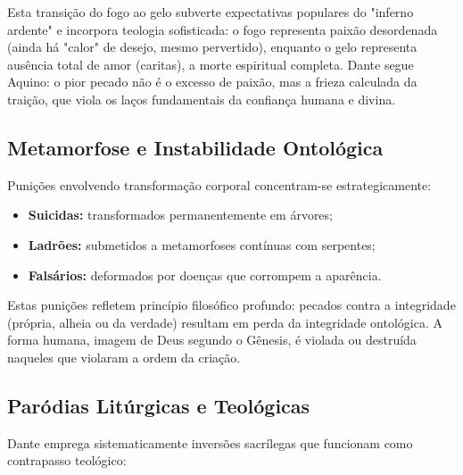 Esta transição do fogo ao gelo subverte expectativas populares do "inferno ardente" e incorpora teologia sofisticada: o fogo representa paixão desordenada (ainda há "calor" de desejo, mesmo pervertido), enquanto o gelo representa ausência total de amor (caritas), a morte espiritual completa. Dante segue Aquino: o pior pecado não é o excesso de paixão, mas a frieza calculada da traição, que viola os laços fundamentais da confiança humana e divina.

\subsection{Metamorfose e Instabilidade Ontológica}

Punições envolvendo transformação corporal concentram-se estrategicamente:

\begin{itemize}
  \item \textbf{Suicidas:} transformados permanentemente em árvores;
  \item \textbf{Ladrões:} submetidos a metamorfoses contínuas com serpentes;
  \item \textbf{Falsários:} deformados por doenças que corrompem a aparência.
\end{itemize}

Estas punições refletem princípio filosófico profundo: pecados contra a integridade (própria, alheia ou da verdade) resultam em perda da integridade ontológica. A forma humana, imagem de Deus segundo o Gênesis, é violada ou destruída naqueles que violaram a ordem da criação.

\subsection{Paródias Litúrgicas e Teológicas}

Dante emprega sistematicamente inversões sacrílegas que funcionam como contrapasso teológico:

